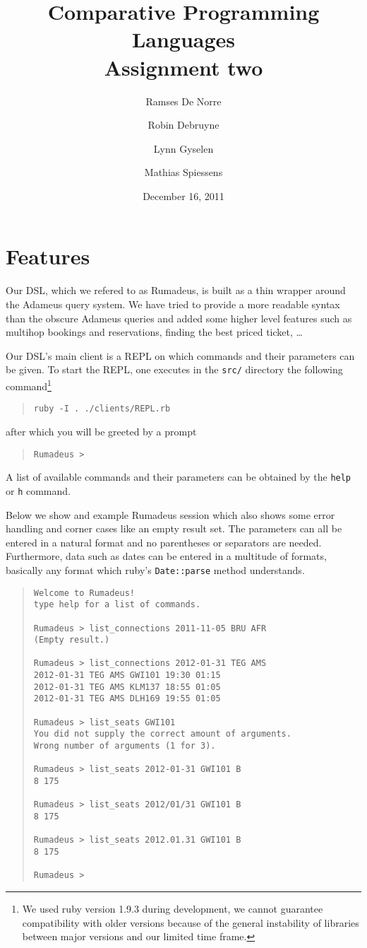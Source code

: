 \documentclass[11pt,pdftex,oneside]{article}
\title{Comparative Programming Languages\\ {\Large Assignment two}}
\author{Ramses De Norre \and Robin Debruyne
        \and Lynn Gyselen \and Mathias Spiessens}
\date{December 16, 2011}
\begin{document}
\maketitle
\thispagestyle{empty}

\section{Features}
Our DSL, which we refered to as Rumadeus, is built as a thin wrapper
around the Adameus query system.
We have tried to provide a more readable syntax than the obscure Adameus
queries and added some higher level features such as multihop bookings and
reservations, finding the best priced ticket, \ldots

Our DSL's main client is a REPL on which commands and their parameters can
be given.
To start the REPL, one executes in the {\tt src/} directory the following
command\footnote{We used ruby version 1.9.3 during development, we cannot
guarantee compatibility with older versions because of the general
instability of libraries between major versions and our limited time
frame.}
\begin{quote}
  {\tt ruby -I . ./clients/REPL.rb}
\end{quote}
after which you will be greeted by a prompt
\begin{quote}
  {\tt Rumadeus >}
\end{quote}
A list of available commands and their parameters can be obtained by the
{\tt help} or {\tt h} command.

Below we show and example Rumadeus session which also shows some error
handling and corner cases like an empty result set.
The parameters can all be entered in a natural format and no parentheses
or separators are needed.
Furthermore, data such as dates can be entered in a multitude of formats,
basically any format which ruby's {\tt Date::parse} method
understands.
\begin{samepage}
  \begin{quote}
    \begin{verbatim}
Welcome to Rumadeus!
type help for a list of commands.

Rumadeus > list_connections 2011-11-05 BRU AFR
(Empty result.)

Rumadeus > list_connections 2012-01-31 TEG AMS
2012-01-31 TEG AMS GWI101 19:30 01:15
2012-01-31 TEG AMS KLM137 18:55 01:05
2012-01-31 TEG AMS DLH169 19:55 01:05

Rumadeus > list_seats GWI101
You did not supply the correct amount of arguments.
Wrong number of arguments (1 for 3).

Rumadeus > list_seats 2012-01-31 GWI101 B
8 175

Rumadeus > list_seats 2012/01/31 GWI101 B
8 175

Rumadeus > list_seats 2012.01.31 GWI101 B
8 175

Rumadeus >
    \end{verbatim}
  \end{quote}
\end{samepage}
\end{document}
